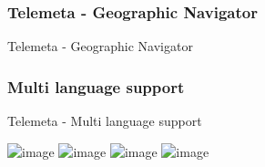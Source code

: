 \documentclass[final, hyperref, table]{beamer}
\begin{document}
\subsubsection{Telemeta - Geographic Navigator}
\begin{frame}[plain, label=geonavigator]{Telemeta - Geographic Navigator}
  \begin{center}
  \end{center}
\hyperlink{telemeta_features}{}
\end{frame}
\subsubsection{Multi language support}
\begin{frame}[label=telemeta_languages]{Telemeta - Multi language support}

  \begin{center}
    \includegraphics<1>[width=1.1\textwidth]{telemeta_english.png}
    \includegraphics<2>[width=1.1\textwidth]{telemeta_french.png}
    \includegraphics<3>[width=1.1\textwidth]{telemeta_german.png}
    \includegraphics<4>[width=1.1\textwidth]{telemeta_chinese.png}
  \end{center}
\hyperlink{telemeta_features}{}
\end{frame}
\end{document}
